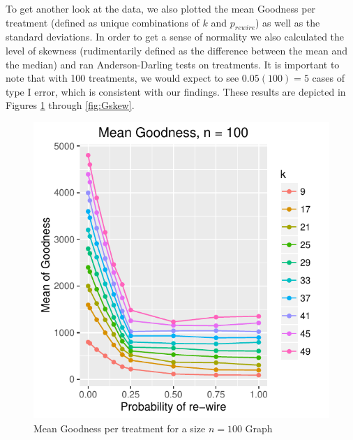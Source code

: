 \documentclass{article}
\begin{document}
 To get another look at the data, we also plotted the mean Goodness per treatment (defined as unique combinations of $k$ and $p_{rewire}$) as well as the standard deviations. In order to get a sense of normality we also calculated the level of skewness (rudimentarily defined as the difference between the mean and the median) and ran Anderson-Darling tests on treatments. It is important to note that with 100 treatments, we would expect to see $0.05(100)=5$ cases of type I error, which is consistent with our findings. These results are depicted in Figures \ref{fig:Gmean} through \ref{fig:Gskew}.

\begin{figure}
\centering
\includegraphics[width=1\textwidth]{3-meanG_by_p_k_n100.pdf}
\caption{\label{fig:Gmean}Mean Goodness per treatment for a size $n = 100$ Graph}
\end{figure}
\end{document}
